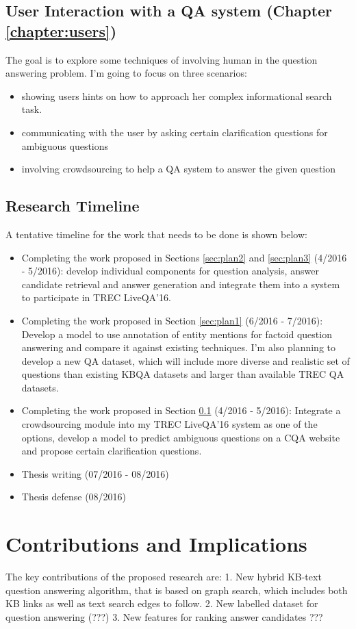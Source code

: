 \subsection{User Interaction with a QA system (Chapter \ref{chapter:users})}
\label{sec:plan4}

The goal is to explore some techniques of involving human in the question answering problem.
I'm going to focus on three scenarios:
\begin{itemize}
\item showing users hints on how to approach her complex informational search task. 
\item communicating with the user by asking certain clarification questions for ambiguous questions
\item involving crowdsourcing to help a QA system to answer the given question
\end{itemize}


\subsection{Research Timeline}

\noindent
A tentative timeline for the work that needs to be done is shown below:

\begin{itemize}
\item Completing the work proposed in Sections \ref{sec:plan2} and \ref{sec:plan3} (4/2016 - 5/2016): develop individual components for question analysis, answer candidate retrieval and answer generation and integrate them into a system to participate in TREC LiveQA'16.
\item Completing the work proposed in Section \ref{sec:plan1} (6/2016 - 7/2016): Develop a model to use annotation of entity mentions for factoid question answering and compare it against existing techniques. I'm also planning to develop a new QA dataset, which will include more diverse and realistic set of questions than existing KBQA datasets and larger than available TREC QA datasets.
\item Completing the work proposed in Section \ref{sec:plan4} (4/2016 - 5/2016): Integrate a crowdsourcing module into my TREC LiveQA'16 system as one of the options, develop a model to predict ambiguous questions on a CQA website and propose certain clarification questions.
\item Thesis writing (07/2016 - 08/2016) 
\item Thesis defense (08/2016)
\end{itemize}


\section{Contributions and Implications}

The key contributions of the proposed research are:
1. New hybrid KB-text question answering algorithm, that is based on graph search, which includes both KB links as well as text search edges to follow.
2. New labelled dataset for question answering (???)
3. New features for ranking answer candidates ???
